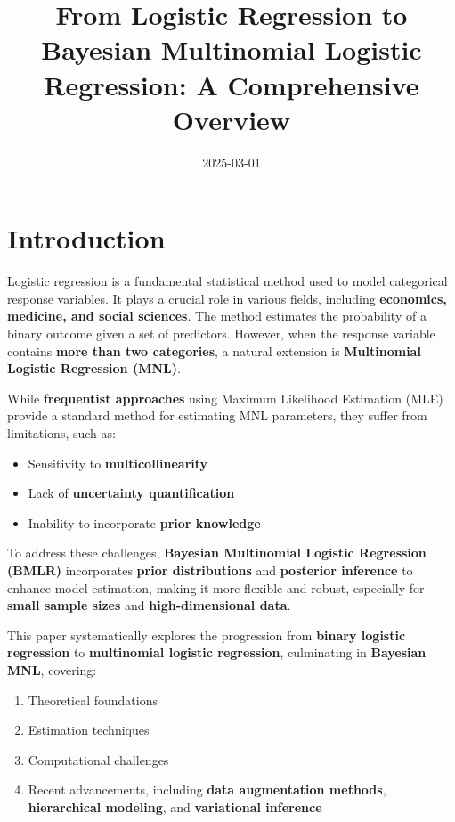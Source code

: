 \documentclass[
  letterpaper,
  DIV=11,
  numbers=noendperiod]{scrartcl}
\title{From Logistic Regression to Bayesian Multinomial Logistic
Regression: A Comprehensive Overview}
\author{}
\date{2025-03-01}
\providecommand{\tightlist}{%
  \setlength{\itemsep}{0pt}\setlength{\parskip}{0pt}}\usepackage{longtable,booktabs,array}
\renewcommand*\contentsname{Table of contents}
\newcommand\contentsname{Table of contents}
\begin{document}
\maketitle
\renewcommand*\contentsname{Table of contents}
{
\hypersetup{linkcolor=}
\setcounter{tocdepth}{3}
\tableofcontents
}
\section{Introduction}\label{introduction}

Logistic regression is a fundamental statistical method used to model
categorical response variables. It plays a crucial role in various
fields, including \textbf{economics, medicine, and social sciences}. The
method estimates the probability of a binary outcome given a set of
predictors. However, when the response variable contains \textbf{more
than two categories}, a natural extension is \textbf{Multinomial
Logistic Regression (MNL)}.

While \textbf{frequentist approaches} using Maximum Likelihood
Estimation (MLE) provide a standard method for estimating MNL
parameters, they suffer from limitations, such as:

\begin{itemize}
\tightlist
\item
  Sensitivity to \textbf{multicollinearity}
\item
  Lack of \textbf{uncertainty quantification}
\item
  Inability to incorporate \textbf{prior knowledge}
\end{itemize}

To address these challenges, \textbf{Bayesian Multinomial Logistic
Regression (BMLR)} incorporates \textbf{prior distributions} and
\textbf{posterior inference} to enhance model estimation, making it more
flexible and robust, especially for \textbf{small sample sizes} and
\textbf{high-dimensional data}.

This paper systematically explores the progression from \textbf{binary
logistic regression} to \textbf{multinomial logistic regression},
culminating in \textbf{Bayesian MNL}, covering:

\begin{enumerate}
\def\labelenumi{\arabic{enumi}.}
\tightlist
\item
  Theoretical foundations\\
\item
  Estimation techniques\\
\item
  Computational challenges\\
\item
  Recent advancements, including \textbf{data augmentation methods},
  \textbf{hierarchical modeling}, and \textbf{variational inference}
\end{enumerate}
\end{document}
